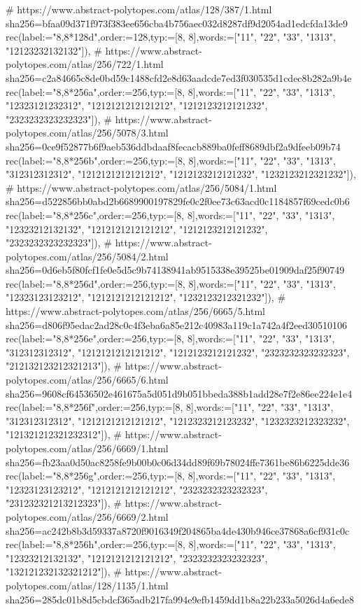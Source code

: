 \documentclass[11pt,a4paper]{article}
\begin{document}
\begin{CompleteProgram}
# https://www.abstract-polytopes.com/atlas/128/387/1.html sha256=bfaa09d371f973f383ee656cba4b756aec032d8287df9d2054ad1edcfda13de9
rec(label:="{8,8}*128d",order:=128,typ:=[8, 8],words:=["11", "22", "33", "1313", "12123232132132"]),
# https://www.abstract-polytopes.com/atlas/256/722/1.html sha256=c2a84665c8de0bd59c1488cfd2e8d63aadcde7ed3f030535d1cdec8b282a9b4e
rec(label:="{8,8}*256a",order:=256,typ:=[8, 8],words:=["11", "22", "33", "1313", "12323121232312", "1212121212121212", "1212123212121232", "2323232323232323"]),
# https://www.abstract-polytopes.com/atlas/256/5078/3.html sha256=0ce9f52877b6f9aeb536ddbdaaf8fecacb889ba0feff8689dbf2a9dfeeb09b74
rec(label:="{8,8}*256b",order:=256,typ:=[8, 8],words:=["11", "22", "33", "1313", "312312312312", "1212121212121212", "1212123212121232", "1232123212321232"]),
# https://www.abstract-polytopes.com/atlas/256/5084/1.html sha256=d522856bb0abd2b6689900197829fe0c2f0ee73c63acd0c1184857f69cedc0b6
rec(label:="{8,8}*256c",order:=256,typ:=[8, 8],words:=["11", "22", "33", "1313", "12323212132132", "1212121212121212", "1212123212121232", "2323232323232323"]),
# https://www.abstract-polytopes.com/atlas/256/5084/2.html sha256=0d6eb5f80fcf1fe0e5d5c9b74138941ab9515338e39525be01909daf25f90749
rec(label:="{8,8}*256d",order:=256,typ:=[8, 8],words:=["11", "22", "33", "1313", "12323123123212", "1212121212121212", "1232123212321232"]),
# https://www.abstract-polytopes.com/atlas/256/6665/5.html sha256=d806f95edac2ad28c0c4f3eba6a85e212c40983a119c1a742a4f2eed30510106
rec(label:="{8,8}*256e",order:=256,typ:=[8, 8],words:=["11", "22", "33", "1313", "312312312312", "1212121212121212", "1212123212121232", "2323232323232323", "212132123212321213"]),
# https://www.abstract-polytopes.com/atlas/256/6665/6.html sha256=9608cf64536502e461675a5d051d9b051bbeda388b1add28e7f2e86ee224e1e4
rec(label:="{8,8}*256f",order:=256,typ:=[8, 8],words:=["11", "22", "33", "1313", "312312312312", "1212121212121212", "1212323212123232", "1232323212323232", "121321212321232312"]),
# https://www.abstract-polytopes.com/atlas/256/6669/1.html sha256=fb23aa0d50ac8258fe9b00b0c06d34dd89f69b78024ffe7361be86b6225dde36
rec(label:="{8,8}*256g",order:=256,typ:=[8, 8],words:=["11", "22", "33", "1313", "12323123123212", "1212121212121212", "2323232323232323", "231232321213212323"]),
# https://www.abstract-polytopes.com/atlas/256/6669/2.html sha256=ac242b8b3d59337a8720f9016349f204865ba4de430b946ce37868a6cf931c0c
rec(label:="{8,8}*256h",order:=256,typ:=[8, 8],words:=["11", "22", "33", "1313", "12323212132132", "1212121212121212", "2323232323232323", "132121232132321212"]),
# https://www.abstract-polytopes.com/atlas/128/1135/1.html sha256=285dc01b8d5cbdcf365adb217fa994e9efb1459dd1b8a22b233a5026d4a6ede8

\end{CompleteProgram}
\end{document}
